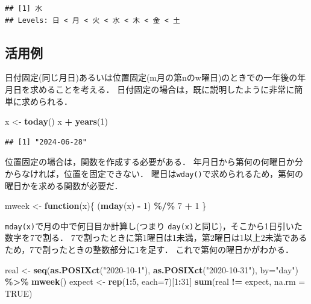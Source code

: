 \documentclass[
]{article}
\newenvironment{Shaded}{\begin{snugshade}}{\end{snugshade}}
\newcommand{\AttributeTok}[1]{\textcolor[rgb]{0.13,0.29,0.53}{#1}}
\newcommand{\ConstantTok}[1]{\textcolor[rgb]{0.56,0.35,0.01}{#1}}
\newcommand{\ControlFlowTok}[1]{\textcolor[rgb]{0.13,0.29,0.53}{\textbf{#1}}}
\newcommand{\DecValTok}[1]{\textcolor[rgb]{0.00,0.00,0.81}{#1}}
\newcommand{\FunctionTok}[1]{\textcolor[rgb]{0.13,0.29,0.53}{\textbf{#1}}}
\newcommand{\NormalTok}[1]{#1}
\newcommand{\OtherTok}[1]{\textcolor[rgb]{0.56,0.35,0.01}{#1}}
\newcommand{\SpecialCharTok}[1]{\textcolor[rgb]{0.81,0.36,0.00}{\textbf{#1}}}
\newcommand{\StringTok}[1]{\textcolor[rgb]{0.31,0.60,0.02}{#1}}
\begin{document}
\begin{verbatim}
## [1] 水
## Levels: 日 < 月 < 火 < 水 < 木 < 金 < 土
\end{verbatim}

\hypertarget{ux6d3bux7528ux4f8b-1}{%
\subsection{活用例}\label{ux6d3bux7528ux4f8b-1}}

日付固定(同じ月日)あるいは位置固定(m月の第nのw曜日)のときでの一年後の年月日を求めることを考える．
日付固定の場合は，既に説明したように非常に簡単に求められる．

\begin{Shaded}
\begin{Highlighting}[]
\NormalTok{x }\OtherTok{\textless{}{-}} \FunctionTok{today}\NormalTok{()}
\NormalTok{x }\SpecialCharTok{+} \FunctionTok{years}\NormalTok{(}\DecValTok{1}\NormalTok{)}
\end{Highlighting}
\end{Shaded}

\begin{verbatim}
## [1] "2024-06-28"
\end{verbatim}

位置固定の場合は，関数を作成する必要がある．
年月日から第何の何曜日か分からなければ，位置を固定できない．
曜日は\texttt{wday()}で求められるため，第何の曜日かを求める関数が必要だ．

\begin{Shaded}
\begin{Highlighting}[]
\NormalTok{mweek }\OtherTok{\textless{}{-}} \ControlFlowTok{function}\NormalTok{(x)\{}
\NormalTok{  (}\FunctionTok{mday}\NormalTok{(x) }\SpecialCharTok{{-}} \DecValTok{1}\NormalTok{) }\SpecialCharTok{\%/\%} \DecValTok{7} \SpecialCharTok{+} \DecValTok{1}
\NormalTok{\}}
\end{Highlighting}
\end{Shaded}

\texttt{mday(x)}で月の中で何日目か計算し(つまり \texttt{day(x)}と同じ)，そこから1日引いた数字を7で割る．
7で割ったときに第1曜日は1未満，第2曜日は1以上2未満であるため，7で割ったときの整数部分に1を足す．
これで第何の曜日かがわかる．

\begin{Shaded}
\begin{Highlighting}[]
\NormalTok{real    }\OtherTok{\textless{}{-}} \FunctionTok{seq}\NormalTok{(}\FunctionTok{as.POSIXct}\NormalTok{(}\StringTok{"2020{-}10{-}1"}\NormalTok{), }\FunctionTok{as.POSIXct}\NormalTok{(}\StringTok{"2020{-}10{-}31"}\NormalTok{), }\AttributeTok{by=}\StringTok{"day"}\NormalTok{) }\SpecialCharTok{\%\textgreater{}\%} \FunctionTok{mweek}\NormalTok{()}
\NormalTok{expect }\OtherTok{\textless{}{-}} \FunctionTok{rep}\NormalTok{(}\DecValTok{1}\SpecialCharTok{:}\DecValTok{5}\NormalTok{, }\AttributeTok{each=}\DecValTok{7}\NormalTok{)[}\DecValTok{1}\SpecialCharTok{:}\DecValTok{31}\NormalTok{]}
\FunctionTok{sum}\NormalTok{(real }\SpecialCharTok{!=}\NormalTok{ expect, }\AttributeTok{na.rm =} \ConstantTok{TRUE}\NormalTok{)}
\end{Highlighting}
\end{Shaded}
\end{document}
